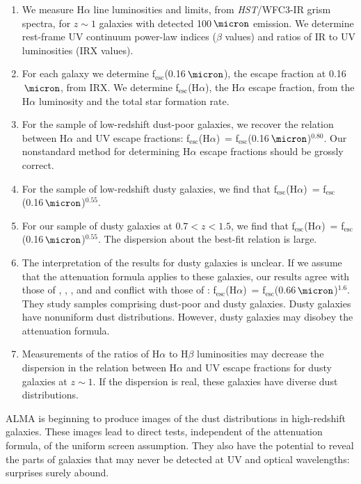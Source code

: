 \documentclass[preprint]{aastex}
\newcommand{\alephuv}{f$_{\mathrm{esc}}$(0.16$\,\micron$)}
\newcommand{\alephha}{f$_{\mathrm{esc}}$(H$\alpha$)}
\newcommand{\alephuvha}{f$_{\mathrm{esc}}$(0.66$\,\micron$)}
\begin{document}
\begin{enumerate}
\item We measure H$\alpha$ line luminosities and limits, from
\emph{HST}/WFC3-IR grism spectra, for $z \sim 1$ galaxies with detected
100$\,\micron$ emission.  We determine rest-frame UV continuum power-law
indices ($\beta$ values) and ratios of IR to UV luminosities (IRX values).
\item For each galaxy we determine \alephuv, the escape fraction at
0.16$\,\micron$, from IRX.  We determine \alephha, the H$\alpha$ escape
fraction, from the H$\alpha$ luminosity and the total star formation rate.
\item For the \citet{overzier11} sample of low-redshift dust-poor galaxies, we
recover the \citet{calzetti97b} relation between H$\alpha$ and UV escape
fractions: \alephha~= \alephuv$^{0.80}$.  Our nonstandard method for determining
H$\alpha$ escape fractions should be grossly correct.
\item For the \citet{hwang13} sample of low-redshift dusty galaxies, we find
that \alephha~= \alephuv$^{0.55}$.
\item For our sample of dusty galaxies at $0.7 < z < 1.5$, we find that
\alephha~= \alephuv$^{0.55}$.  The dispersion about the best-fit relation is
large.
\item The interpretation of the results for dusty galaxies is unclear.  If we
assume that the \citet{calzetti00} attenuation formula applies to these
galaxies, our results agree with those of \citet{onodera10}, \citet{kashino13},
\citet{price13}, and \citet{reddy15} and conflict with those of \citet{erb06}: \alephha~=
\alephuvha$^{1.6}$.  They study
samples comprising dust-poor and dusty galaxies.  Dusty galaxies have
nonuniform dust distributions.  However, dusty galaxies may disobey the
\citet{calzetti00} attenuation formula.
\item Measurements of the ratios of H$\alpha$ to H$\beta$ luminosities may
decrease the dispersion in the relation between H$\alpha$ and UV escape
fractions for dusty galaxies at $z \sim 1$.  If the dispersion is real, these
galaxies have diverse dust distributions.
\end{enumerate}

ALMA is beginning to produce images of the dust distributions in high-redshift
galaxies.  These images lead to direct tests, independent of the attenuation
formula, of the uniform screen assumption.  They also have the potential to
reveal the parts of galaxies that may never be detected at UV and optical
wavelengths: surprises surely abound.
\end{document}

